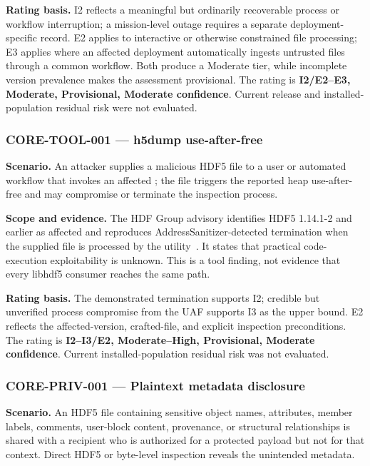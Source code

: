 \documentclass[../main.tex]{subfiles}
\begin{document}
\noindent\textbf{Rating basis.}
I2 reflects a meaningful but ordinarily recoverable process or workflow
interruption; a mission-level outage requires a separate deployment-specific
record. E2 applies to interactive or otherwise constrained file processing;
E3 applies where an affected deployment automatically ingests untrusted files
through a common workflow. Both produce a Moderate tier, while incomplete
version prevalence makes the assessment provisional. The rating is
\textbf{I2/E2--E3, Moderate, Provisional, Moderate confidence}. Current release
and installed-population residual risk were not evaluated.

\subsubsection*{CORE-TOOL-001 --- h5dump use-after-free}

\noindent\textbf{Scenario.}
An attacker supplies a malicious HDF5 file to a user or automated workflow that
invokes an affected ; the file triggers the reported
 heap use-after-free and may compromise or terminate the
inspection process.

\noindent\textbf{Scope and evidence.}
The HDF Group advisory identifies HDF5 1.14.1-2 and earlier as affected and
reproduces AddressSanitizer-detected termination when the supplied file is
processed by the utility~\cite{cve-2026-34734,hdf5-ghsa-w7v2-9cmr-pwwj}. It
states that practical code-execution exploitability is unknown. This is a tool
finding, not evidence that every libhdf5 consumer reaches the same path.

\noindent\textbf{Rating basis.}
The demonstrated termination supports I2; credible but unverified process
compromise from the UAF supports I3 as the upper bound. E2 reflects the
affected-version, crafted-file, and explicit inspection preconditions. The
rating is \textbf{I2--I3/E2, Moderate--High, Provisional, Moderate confidence}.
Current installed-population residual risk was not evaluated.

\subsubsection*{CORE-PRIV-001 --- Plaintext metadata disclosure}

\noindent\textbf{Scenario.}
An HDF5 file containing sensitive object names, attributes, member labels,
comments, user-block content, provenance, or structural relationships is shared
with a recipient who is authorized for a protected payload but not for that
context. Direct HDF5 or byte-level inspection reveals the unintended metadata.
\end{document}
